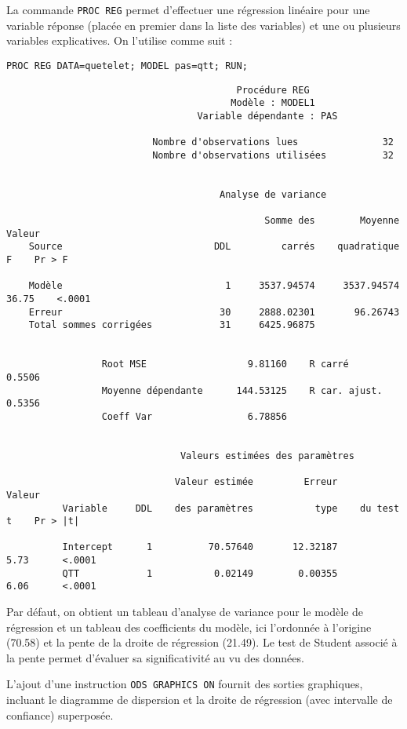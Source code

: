 La commande \texttt{PROC REG} permet d'effectuer une régression linéaire
pour une variable réponse (placée en premier dans la liste des variables) et
une ou plusieurs variables explicatives. On l'utilise comme suit :
\begin{verbatim}
PROC REG DATA=quetelet; MODEL pas=qtt; RUN;
\end{verbatim}

\begin{verbatim}
                                         Procédure REG
                                        Modèle : MODEL1
                                  Variable dépendante : PAS

                          Nombre d'observations lues               32
                          Nombre d'observations utilisées          32


                                      Analyse de variance

                                              Somme des        Moyenne     Valeur
    Source                           DDL         carrés    quadratique          F    Pr > F

    Modèle                             1     3537.94574     3537.94574      36.75    <.0001
    Erreur                            30     2888.02301       96.26743
    Total sommes corrigées            31     6425.96875


                 Root MSE                  9.81160    R carré           0.5506
                 Moyenne dépendante      144.53125    R car. ajust.     0.5356
                 Coeff Var                 6.78856


                               Valeurs estimées des paramètres

                              Valeur estimée         Erreur       Valeur
          Variable     DDL    des paramètres           type    du test t    Pr > |t|

          Intercept      1          70.57640       12.32187         5.73      <.0001
          QTT            1           0.02149        0.00355         6.06      <.0001
\end{verbatim}
Par défaut, on obtient un tableau d'analyse de variance pour le modèle de
régression et un tableau des coefficients du modèle, ici l'ordonnée à
l'origine (70.58) et la pente de la droite de régression (21.49). Le test
de Student associé à la pente permet d'évaluer sa significativité au vu des
données. 

L'ajout d'une instruction \verb|ODS GRAPHICS ON| fournit des sorties
graphiques, incluant le diagramme de dispersion et la droite de régression
(avec intervalle de confiance) superposée.

